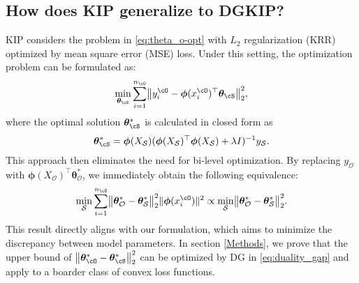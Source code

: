 \subsection{How does KIP generalize to DGKIP?}
KIP considers the problem in \eqref{eq:theta_o-opt} with $L_2$ regularization (KRR) optimized by mean square error (MSE) loss. Under this setting, the optimization problem can be formulated as:
\begin{equation*}
    \min_{\bm \theta_{\cS}}
    \sum_{i=1}^{n_{\cO}}\bigl\|y^{\cO}_i - \bm \phi(x^{\cO}_i)^\top \bm \theta_{\cS} \bigr\|_2^2, 
\end{equation*}
where the optimal solution $\bm \theta_{\cS}^*$ is calculated in closed form as
\begin{equation*}
\bm \theta_{\cS}^* = \bm \phi(X_\mathcal{S}) (\bm \phi(X_\mathcal{S})^\top \bm \phi(X_\mathcal{S}) + \lambda I)^{-1} y_{\mathcal{S}}.
\end{equation*}
This approach then eliminates the need for bi-level optimization.  
By replacing $ y_\mathcal{O} $ with $ \bm \phi(X_\mathcal{O})^\top \boldsymbol{\theta}_\mathcal{O}^* $, we immediately obtain the following equivalence:
\[
\min_{\mathcal{S}} 
\sum_{i=1}^{n_{\cO}}
\bigl\|\boldsymbol{\theta}_\mathcal{O}^* - \boldsymbol{\theta}_\mathcal{S}^* \bigr\|_2^2 \| \bm \phi(x^{\cO}_i)\|^2 \propto \min_{\mathcal{S}} \bigl\|\boldsymbol{\theta}_\mathcal{O}^* - \boldsymbol{\theta}_\mathcal{S}^* \bigr\|_2^2.
\]
This result directly aligns with our formulation, which aims to minimize the discrepancy between model parameters. In section \ref{Methods}, we prove that the upper bound of 
$\bigl\|\bm \theta_{\cO}^* - \bm \theta_{\cS}^* \bigr\|_2^2$ can be optimized by DG in \eqref{eq:duality_gap} and apply to a boarder class of convex loss functions.










